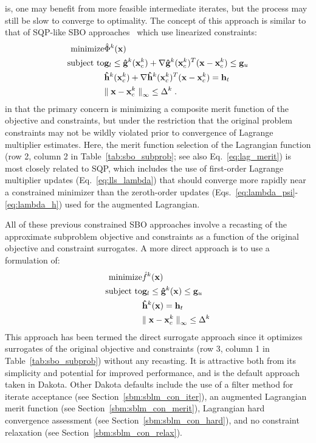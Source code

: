 is, one may benefit from more feasible intermediate iterates, but the
process may still be slow to converge to optimality.  The concept of
this approach is similar to that of SQP-like SBO
approaches~\cite{Ale00} which use linearized constraints:
\begin{eqnarray}
{\rm minimize } & {\hat \Phi}^k({\bf x}) \nonumber \\
{\rm subject\  to } 
& {\bf g}_l \le {\bf {\hat g}}^k({\bf x}^k_c) + 
\nabla {\bf {\hat g}}^k({\bf x}^k_c)^T ({\bf x} - {\bf x}^k_c) \le {\bf g}_u 
\nonumber \\
& {\bf {\hat h}}^k({\bf x}^k_c) + \nabla {\bf {\hat h}}^k({\bf x}^k_c)^T 
({\bf x} - {\bf x}^k_c) = {\bf h}_t \nonumber \\
& {\parallel {\bf x} - {\bf x}^k_c \parallel}_\infty \le \Delta^k \; . 
\label{eq:NLP_SBO_SQP}
\end{eqnarray}
in that the primary concern is minimizing a composite merit function
of the objective and constraints, but under the restriction that the
original problem constraints may not be wildly violated prior to
convergence of Lagrange multiplier estimates.  Here, the merit
function selection of the Lagrangian function (row 2, column 2 in
Table~\ref{tab:sbo_subprob}; see also Eq.~\ref{eq:lag_merit}) is most
closely related to SQP, which includes the use of first-order Lagrange
multiplier updates (Eq.~\ref{eq:lls_lambda}) that should converge more
rapidly near a constrained minimizer than the zeroth-order updates
(Eqs.~\ref{eq:lambda_psi}-\ref{eq:lambda_h}) used for the augmented
Lagrangian.

All of these previous constrained SBO approaches involve a recasting
of the approximate subproblem objective and constraints as a function
of the original objective and constraint surrogates.  A more direct
approach is to use a formulation of:
\begin{eqnarray}
{\rm minimize } & {\hat f}^k({\bf x}) \nonumber \\
{\rm subject\  to } 
	& {\bf g}_l \le {\bf {\hat g}}^k({\bf x}) \le {\bf g}_u \nonumber \\
	&               {\bf {\hat h}}^k({\bf x}) = {\bf h}_t \nonumber \\
	& {\parallel {\bf x} - {\bf x}^k_c \parallel}_\infty \le \Delta^k 
\label{eq:NLP_SBO_direct}
\end{eqnarray}
This approach has been termed the direct surrogate approach since it
optimizes surrogates of the original objective and constraints (row 3,
column 1 in Table~\ref{tab:sbo_subprob}) without any recasting.  It is
attractive both from its simplicity and potential for improved performance,
and is the default approach taken in Dakota.  Other Dakota defaults
include the use of a filter method for iterate acceptance (see
Section~\ref{sbm:sblm_con_iter}), an augmented Lagrangian merit
function (see Section~\ref{sbm:sblm_con_merit}), Lagrangian hard
convergence assessment (see Section~\ref{sbm:sblm_con_hard}), and no
constraint relaxation (see Section~\ref{sbm:sblm_con_relax}).

